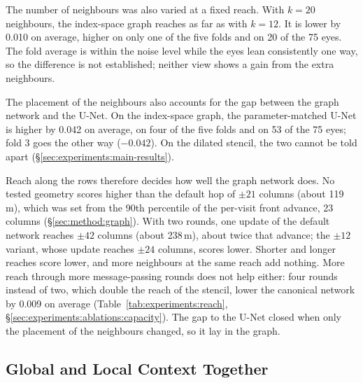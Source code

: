 
The number of neighbours was also varied at a fixed reach. With $k = 20$
neighbours, the index-space graph reaches as far as with $k = 12$. It is
lower by 0.010 on average, higher on only one of the five folds and on 20
of the 75 eyes. The fold average is within the noise level while the eyes
lean consistently one way, so the difference is not established; neither
view shows a gain from the extra neighbours.

The placement of the neighbours also accounts for the gap between the
graph network and the U-Net. On the index-space graph, the
parameter-matched U-Net is higher by 0.042 on average, on four of the five
folds and on 53 of the 75 eyes; fold 3 goes the other way ($-0.042$). On
the dilated stencil, the two cannot be told apart
(\S\ref{sec:experiments:main-results}).

Reach along the rows therefore decides how well the graph network does.
No tested geometry scores higher than the default hop of $\pm 21$ columns
(about 119\,\textmu{}m), which was set from the 90th percentile of the
per-visit front advance, 23 columns (\S\ref{sec:method:graph}). With two
rounds, one update of the default network reaches $\pm 42$ columns (about
238\,\textmu{}m), about twice that advance; the $\pm 12$ variant, whose
update reaches $\pm 24$ columns, scores lower. Shorter and longer reaches
score lower, and
more neighbours at the same reach add nothing. More reach through more
message-passing rounds does not help either: four rounds instead of two,
which double the reach of the stencil, lower the canonical network by
0.009 on average (Table~\ref{tab:experiments:reach},
\S\ref{sec:experiments:ablations:capacity}). The gap to
the U-Net closed when only the placement of the neighbours changed, so it
lay in the graph.

\subsection{Global and Local Context Together}
\label{sec:experiments:ingredients:global}

